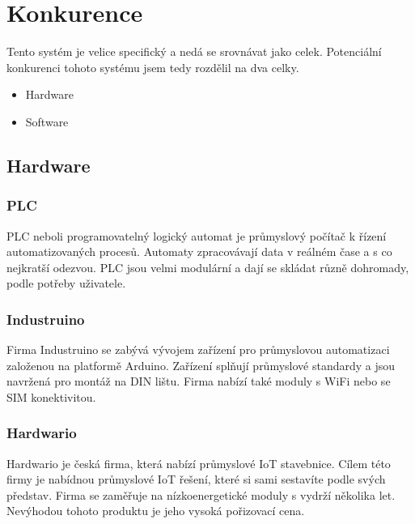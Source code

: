 \chapter{Konkurence}
Tento systém je velice specifický a nedá se srovnávat jako celek. 
Potenciální konkurenci tohoto systému jsem tedy rozdělil na dva celky.

\begin{itemize} %
    \item Hardware
    \item Software
\end{itemize}



\section{Hardware}

\fxnote[author=JA]{\textcolor{mygreen}{Přidat obrázky}}

\subsection{PLC}
PLC neboli programovatelný logický automat je průmyslový počítač k řízení automatizovaných procesů.
Automaty zpracovávají data v reálném čase a s co nejkratší odezvou.
PLC jsou velmi modulární a dají se skládat různě dohromady, podle potřeby uživatele.



\subsection{Industruino}
Firma Industruino\cite{INDUSTRINO} se zabývá vývojem zařízení pro průmyslovou automatizaci založenou na platformě Arduino.
Zařízení splňují průmyslové standardy a jsou navržená pro montáž na  DIN lištu. Firma nabízí také moduly s WiFi nebo se SIM konektivitou.


\subsection{Hardwario}
Hardwario\cite{HARDWARIO} je česká firma, která nabízí průmyslové IoT stavebnice.
Cílem této firmy je nabídnou průmyslové IoT řešení, které si sami sestavíte podle svých představ.
Firma se zaměřuje na nízkoenergetické moduly s vydrží několika let.
Nevýhodou tohoto produktu je jeho vysoká pořizovací cena. 
\fxnote[author=JA]{\textcolor{mygreen}{Cena???}}


